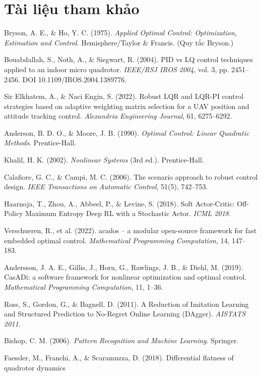\documentclass[11pt]{article}
\begin{document}
\section{Tài liệu tham khảo}
\begin{enumerate}[leftmargin=2.0em,itemsep=1pt,label={[\arabic*]}]
\item Bryson, A. E., \& Ho, Y. C. (1975). \emph{Applied Optimal Control: Optimization, Estimation and
Control}. Hemisphere/Taylor \& Francis. (Quy tắc Bryson.)
\item Bouabdallah, S., Noth, A., \& Siegwart, R. (2004). PID vs LQ control techniques applied to an indoor
micro quadrotor. \emph{IEEE/RSJ IROS 2004}, vol. 3, pp. 2451--2456. DOI 10.1109/IROS.2004.1389776.
\item Sir Elkhatem, A., \& Naci Engin, S. (2022). Robust LQR and LQR-PI control strategies based on
adaptive weighting matrix selection for a UAV position and attitude tracking control. \emph{Alexandria
Engineering Journal}, 61, 6275--6292.
\item Anderson, B. D. O., \& Moore, J. B. (1990). \emph{Optimal Control: Linear Quadratic Methods}.
Prentice-Hall.
\item Khalil, H. K. (2002). \emph{Nonlinear Systems} (3rd ed.). Prentice-Hall.
\item Calafiore, G. C., \& Campi, M. C. (2006). The scenario approach to robust control design. \emph{IEEE
Transactions on Automatic Control}, 51(5), 742--753.
\item Haarnoja, T., Zhou, A., Abbeel, P., \& Levine, S. (2018). Soft Actor-Critic: Off-Policy Maximum
Entropy Deep RL with a Stochastic Actor. \emph{ICML 2018}.
\item Verschueren, R., et al. (2022). acados -- a modular open-source framework for fast embedded optimal
control. \emph{Mathematical Programming Computation}, 14, 147--183.
\item Andersson, J. A. E., Gillis, J., Horn, G., Rawlings, J. B., \& Diehl, M. (2019). CasADi: a software
framework for nonlinear optimization and optimal control. \emph{Mathematical Programming Computation}, 11,
1--36.
\item Ross, S., Gordon, G., \& Bagnell, D. (2011). A Reduction of Imitation Learning and Structured
Prediction to No-Regret Online Learning (DAgger). \emph{AISTATS 2011}.
\item Bishop, C. M. (2006). \emph{Pattern Recognition and Machine Learning}. Springer.
\item Faessler, M., Franchi, A., \& Scaramuzza, D. (2018). Differential flatness of quadrotor dynamics

\end{enumerate}
\end{document}
